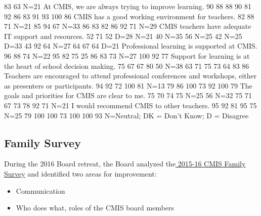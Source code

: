 {83%
63%
N=21%
At CMIS, we are always trying to improve learning. 
90%
88%
88%
90%
81%
92%
86%
83%
91%
93%
100%
86%
CMIS has a good working environment for teachers.
82%
88%
71%
N=21%
85%
94%
67%
N=33%
86%
83%
82%
86%
92%
71%
N=29%
CMIS teachers have adequate IT support and resources.
52%
71%
52%
D=28%
N=21%
40%
N=35
56%
N=25
42%
N=25%
D=33%
43%
92%
64%
N=27%
64%
67%
64%
D=21%
Professional learning is supported at CMIS. 
96%
88%
74%
N=22%
95%
82%
75%
25%
86%
83%
73%
N=27%
100%
92%
77%
Support for learning is at the heart of school decision making. 
75%
67%
67%
80%
50%
N=38
63%
71%
75%
73%
64%
83%
86%
Teachers are encouraged to attend professional conferences and workshops, either as presenters or participants.
94%
92%
72%
100%
81%
N=13
79%
86%
100%
73%
92%
100%
79%
The goals and priorities for CMIS are clear to me.
75%
70%
74%
75%
N=25
56%
N=32
75%
71%
67%
73%
78%
92%
71%
N=21%
I would recommend CMIS to other teachers.
95%
92%
81%
95%
75%
N=25
79%
100%
100%
73%
100%
100%
93%
N=Neutral; DK = Don’t Know; D = Disagree
}


\subsection{Family Survey}

During the 2016 Board retreat, the Board analyzed the\href{https://docs.google.com/a/cmis.ac.th/forms/d/16Gbd3MzQOXtjjZ2dG460xw5SHG_eohMIKet3lxYUdAY/edit#responses}{ 2015-16 CMIS Family Survey} and identified two areas for improvement:
\begin{itemize}
\item Communication
\item Who does what, roles of the CMIS board members
\end{itemize}


